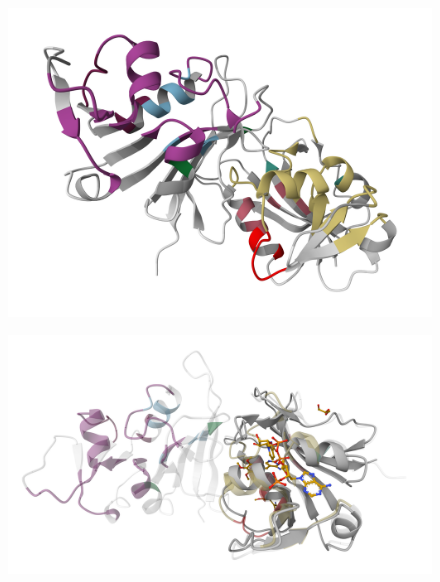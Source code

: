\documentclass[aspectratio=169]{beamer}
\begin{document}
\begin{frame}
  \begin{figure}
    \centering
    \includegraphics[width=\linewidth,height=\textheight,keepaspectratio]{fig/screen3.png}
  \end{figure}

\end{frame}

\begin{frame}
  \begin{figure}
    \centering
    \includegraphics[width=\linewidth,height=\textheight,keepaspectratio]{fig/screen4.png}
  \end{figure}

\end{frame}

\begin{frame}[plain]
\end{frame}
\end{document}

